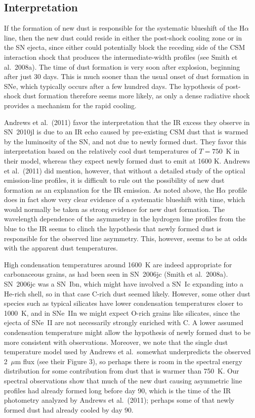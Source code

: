 \documentclass{emulateapj}
\begin{document}
\subsection{Interpretation}

If the formation of new dust is responsible for the systematic
blueshift of the H$\alpha$ line, then the new dust could reside in
either the post-shock cooling zone or in the SN ejecta, since either
could potentially block the receding side of the CSM interaction shock
that produces the intermediate-width profiles (see Smith et al.\
2008a).  The time of dust formation is very soon after explosion,
beginning after just 30 days.  This is much sooner than the usual
onset of dust formation in SNe, which typically occurs after a few
hundred days.  The hypothesis of post-shock dust formation therefore
seems more likely, as only a dense radiative shock provides a
mechanism for the rapid cooling.


Andrews et al.\ (2011) favor the interpretation that the IR excess
they observe in SN~2010jl is due to an IR echo caused by pre-existing
CSM dust that is warmed by the luminosity of the SN, and not due to
newly formed dust.  They favor this interpretation based on the
relatively cool dust temperatures of $T = 750$~K in their model, whereas
they expect newly formed dust to emit at 1600 K. Andrews et al.\
(2011) did mention, however, that without a detailed study of the
optical emission-line profiles, it is difficult to rule out the
possibility of new dust formation as an explanation for the IR
emission.  As noted above, the H$\alpha$ profile does in fact show
very clear evidence of a systematic blueshift with time, which would
normally be taken as strong evidence for new dust formation.  The
wavelength dependence of the asymmetry in the hydrogen line profiles from
the blue to the IR seems to clinch the hypothesis that newly formed
dust is responsible for the observed line asymmetry.  This, however,
seems to be at odds with the apparent dust temperatures.

High condensation temperatures around 1600~K are indeed appropriate
for carbonaceous grains, as had been seen in SN~2006jc (Smith et al.\
2008a).  SN~2006jc was a SN~Ibn, which might have involved a SN~Ic
expanding into a He-rich shell, so in that case C-rich dust seemed
likely.  However, some other dust species such as typical silicates
have lower condensation temperatures closer to 1000~K, and in SNe~IIn
we might expect O-rich grains like silicates, since the ejecta of
SNe~II are not necessarily strongly enriched with C.  A lower assumed
condensation temperature might allow the hypothesis of newly formed
dust to be more consistent with observations.  Moreover, we note that
the single dust temperature model used by Andrews et al.\ somewhat
underpredicts the observed 2~$\mu$m flux (see their Figure 3), so
perhaps there is room in the spectral energy distribution for some
contribution from dust that is warmer than 750~K.  Our spectral
observations show that much of the new dust causing asymmetric line
profiles had already formed long before day 90, which is the time of
the IR photometry analyzed by Andrews et al.\ (2011); perhaps some of
that newly formed dust had already cooled by day 90.
\end{document}
